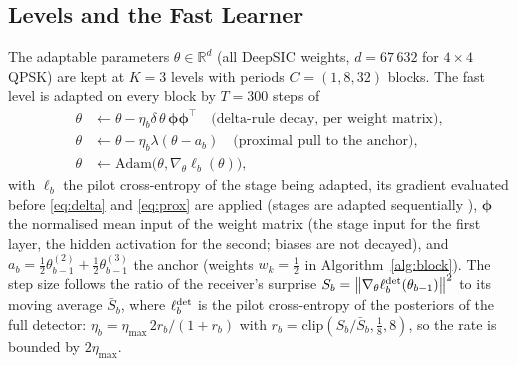 \documentclass[journal]{IEEEtran}
\theoremstyle{remark}
\newcommand{\norm}[1]{\left\lVert #1 \right\rVert}
\begin{document}
\subsection{Levels and the Fast Learner}
The adaptable parameters $\theta\in\mathbb{R}^d$ (all DeepSIC weights, $d=67\,632$ for $4\times4$ QPSK)
are kept at $K=3$ levels with periods $C=(1,8,32)$ blocks. The fast level is adapted on every
block by $T=300$ steps of
\begin{align}
\theta&\leftarrow\theta-\eta_b\delta\,\theta\,\bm\phi\bm\phi^{\!\top}\quad\text{(delta-rule decay, per weight matrix)},\label{eq:delta}\\
\theta&\leftarrow\theta-\eta_b\lambda(\theta-a_b)\quad\text{(proximal pull to the anchor)},\label{eq:prox}\\
\theta&\leftarrow\mathrm{Adam}\big(\theta,\nabla_\theta\ell_b(\theta)\big),\label{eq:adam}
\end{align}
with $\ell_b$ the pilot cross-entropy of the stage being adapted, its gradient evaluated before \eqref{eq:delta} and \eqref{eq:prox} are applied (stages are adapted sequentially
\cite{shlezinger2021}), $\bm\phi$ the normalised mean input of the weight matrix (the stage input for
the first layer, the hidden activation for the second; biases are not decayed), and
$a_b=\tfrac12\theta^{(2)}_{b-1}+\tfrac12\theta^{(3)}_{b-1}$ the anchor (weights $w_k=\tfrac12$ in Algorithm~\ref{alg:block}). The step size follows the ratio of the receiver's surprise $S_b=\norm{\nabla_\theta\ell^{\rm det}_b(\theta_{b-1})}^2$ to its moving average $\bar S_b$, where $\ell^{\rm det}_b$ is the pilot cross-entropy of the posteriors of the full detector: $\eta_b=\eta_{\max}\,2r_b/(1+r_b)$ with $r_b=\mathrm{clip}(S_b/\bar S_b,\tfrac18,8)$, so the rate is
bounded by $2\eta_{\max}$.
\end{document}
